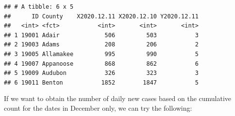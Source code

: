 \documentclass[]{book}
\newenvironment{Shaded}{\begin{snugshade}}{\end{snugshade}}
\newcommand{\KeywordTok}[1]{\textcolor[rgb]{0.13,0.29,0.53}{\textbf{#1}}}
\newcommand{\DataTypeTok}[1]{\textcolor[rgb]{0.13,0.29,0.53}{#1}}
\newcommand{\FloatTok}[1]{\textcolor[rgb]{0.00,0.00,0.81}{#1}}
\newcommand{\StringTok}[1]{\textcolor[rgb]{0.31,0.60,0.02}{#1}}
\newcommand{\CommentTok}[1]{\textcolor[rgb]{0.56,0.35,0.01}{\textit{#1}}}
\newcommand{\OperatorTok}[1]{\textcolor[rgb]{0.81,0.36,0.00}{\textbf{#1}}}
\newcommand{\NormalTok}[1]{#1}
\begin{document}
\begin{Shaded}
\end{Shaded}

\begin{verbatim}
## # A tibble: 6 x 5
##      ID County    X2020.12.11 X2020.12.10 Y2020.12.11
##   <int> <fct>           <int>       <int>       <int>
## 1 19001 Adair             506         503           3
## 2 19003 Adams             208         206           2
## 3 19005 Allamakee         995         990           5
## 4 19007 Appanoose         868         862           6
## 5 19009 Audubon           326         323           3
## 6 19011 Benton           1852        1847           5
\end{verbatim}

If we want to obtain the number of daily new cases based on the
cumulative count for the dates in December only, we can try the
following:
\end{document}
